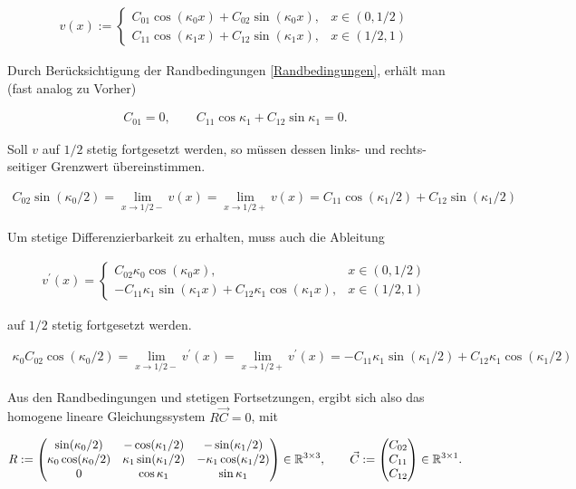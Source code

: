 \begin{align*}
  v(x) :=
  \begin{cases}
    C_{01} \cos{(\kappa_0 x)} + C_{02} \sin{(\kappa_0 x)},
    & x \in (0, 1/2) \\
    C_{11} \cos{(\kappa_1 x)} + C_{12} \sin{(\kappa_1 x)},
    & x \in (1/2, 1)
  \end{cases}
\end{align*}

Durch Berücksichtigung der Randbedingungen \eqref{Randbedingungen}, erhält man (fast analog zu Vorher)

\begin{align*}
  C_{01} = 0, \qquad
  C_{11} \cos{\kappa_1} + C_{12} \sin{\kappa_1} = 0.
\end{align*}

Soll $v$ auf $1/2$ stetig fortgesetzt werden, so müssen dessen links- und rechts-seitiger Grenzwert übereinstimmen.

\begin{align*}
  C_{02} \sin(\kappa_0/2)
  = \lim_{x \to 1/2-} v(x)
  = \lim_{x \to 1/2+} v(x)
  = C_{11} \cos(\kappa_1/2) + C_{12} \sin(\kappa_1/2)
\end{align*}

Um stetige Differenzierbarkeit zu erhalten, muss auch die Ableitung

\begin{align*}
  v^\prime(x) =
  \begin{cases}
    C_{02} \kappa_0 \cos(\kappa_0 x),
    & x \in (0, 1/2) \\
    - C_{11} \kappa_1 \sin(\kappa_1 x) + C_{12} \kappa_1 \cos(\kappa_1 x),
    & x \in (1/2, 1)
  \end{cases}
\end{align*}

auf $1/2$ stetig fortgesetzt werden.

\begin{align*}
  \kappa_0 C_{02} \cos(\kappa_0/2)
  = \lim_{x \to 1/2-} v^\prime(x)
  = \lim_{x \to 1/2+} v^\prime(x)
  = - C_{11} \kappa_1 \sin(\kappa_1/2) + C_{12} \kappa_1 \cos(\kappa_1/2)
\end{align*}

Aus den Randbedingungen und stetigen Fortsetzungen, ergibt sich also das homogene lineare Gleichungssystem $R \vec C = 0$, mit

\begin{align*}
  R :=
  \begin{pmatrix}
    \sin(\kappa_0/2)          & -\cos(\kappa_1/2)         & -\sin(\kappa_1/2) \\
    \kappa_0 \cos(\kappa_0/2) & \kappa_1 \sin(\kappa_1/2) & - \kappa_1 \cos(\kappa_1/2) \\
    0                         & \cos{\kappa_1}            & \sin{\kappa_1}
  \end{pmatrix}
  \in \mathbb{R}^{3 \times 3}, \qquad
  \vec C :=
  \begin{pmatrix}
    C_{02} \\
    C_{11} \\
    C_{12}
  \end{pmatrix}
  \in \mathbb{R}^{3 \times 1}.
\end{align*}


